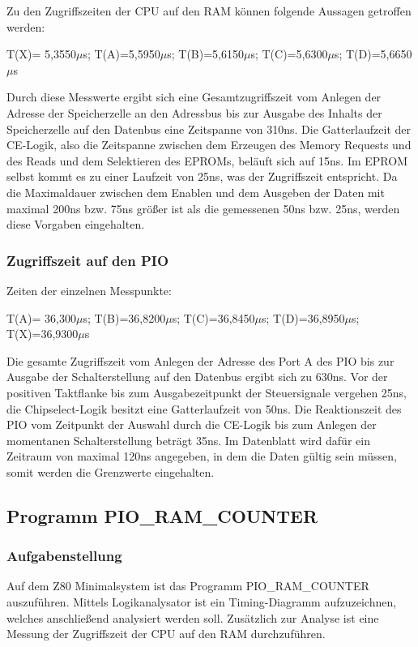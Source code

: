Zu den Zugriffszeiten der CPU auf den RAM können folgende Aussagen getroffen werden:

T(X)= 5,3550$\mu$s; T(A)=5,5950$\mu$s; T(B)=5,6150$\mu$s; T(C)=5,6300$\mu$s; T(D)=5,6650$\mu$s

Durch diese Messwerte ergibt sich eine Gesamtzugriffszeit vom Anlegen der Adresse der Speicherzelle an den Adressbus bis zur Ausgabe des Inhalts der Speicherzelle auf den Datenbus eine Zeitspanne von 310ns. Die Gatterlaufzeit der CE-Logik, also die Zeitspanne zwischen dem Erzeugen des Memory Requests und des Reads und dem Selektieren des EPROMs, beläuft sich auf 15ns. Im EPROM selbst kommt es zu einer Laufzeit von 25ns, was der Zugriffszeit entspricht. Da die Maximaldauer zwischen dem Enablen und dem Ausgeben der Daten mit maximal 200ns bzw. 75ns größer ist als die gemessenen 50ns bzw. 25ns, werden diese Vorgaben eingehalten.

\subsubsection{Zugriffszeit auf den PIO}
Zeiten der einzelnen Messpunkte:

T(A)= 36,300$\mu$s;  T(B)=36,8200$\mu$s; T(C)=36,8450$\mu$s; T(D)=36,8950$\mu$s; T(X)=36,9300$\mu$s

Die gesamte Zugriffszeit vom Anlegen der Adresse des Port A des PIO bis zur Ausgabe der Schalterstellung auf den Datenbus ergibt sich zu 630ns. Vor der positiven Taktflanke bis zum Ausgabezeitpunkt der Steuersignale vergehen 25ns, die Chipselect-Logik besitzt eine Gatterlaufzeit von 50ns. Die Reaktionszeit des PIO vom Zeitpunkt der Auswahl durch die CE-Logik bis zum Anlegen der momentanen Schalterstellung beträgt 35ns. Im Datenblatt wird dafür ein Zeitraum von maximal 120ns angegeben, in dem die Daten gültig sein müssen, somit werden die Grenzwerte eingehalten.

\subsection{Programm PIO\_RAM\_COUNTER}
\subsubsection{Aufgabenstellung}
Auf dem Z80 Minimalsystem ist das Programm PIO\_RAM\_COUNTER auszuführen. Mittels Logikanalysator ist ein Timing-Diagramm aufzuzeichnen, welches anschließend analysiert werden soll. Zusätzlich zur Analyse ist eine Messung der Zugriffszeit der CPU auf den RAM durchzuführen.

